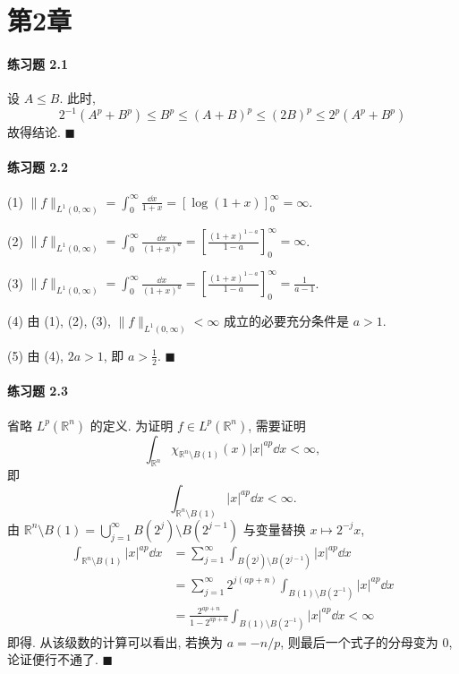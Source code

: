 \section*{第2章}

\paragraph*{练习题 2.1}
设 $A \leq B$. 此时,
\[
2^{-1}(A^{p}+B^{p}) \leq B^{p} \leq (A+B)^{p} \leq (2B)^{p} \leq 2^{p}(A^{p}+B^{p})
\]
故得结论. $\blacksquare$

\paragraph*{练习题 2.2}
(1) $\|f\|_{L^{1}(0,\infty)} = \int_{0}^{\infty}\frac{\dd x}{1+x} = [\log(1+x)]_{0}^{\infty} = \infty$.

(2) $\|f\|_{L^{1}(0,\infty)} = \int_{0}^{\infty}\frac{\dd x}{(1+x)^{a}} = \left[\frac{(1+x)^{1-a}}{1-a}\right]_{0}^{\infty} = \infty$.

(3) $\|f\|_{L^{1}(0,\infty)} = \int_{0}^{\infty}\frac{\dd x}{(1+x)^{a}} = \left[\frac{(1+x)^{1-a}}{1-a}\right]_{0}^{\infty} = \frac{1}{a-1}$.

(4) 由 (1), (2), (3), $\|f\|_{L^{1}(0,\infty)} < \infty$ 成立的必要充分条件是 $a > 1$.

(5) 由 (4), $2a > 1$, 即 $a > \frac{1}{2}$. $\blacksquare$

\paragraph*{练习题 2.3}
省略 $L^{p}(\mathbb{R}^{n})$ 的定义. 为证明 $f \in L^{p}(\mathbb{R}^{n})$, 需要证明
\[
\int_{\mathbb{R}^{n}}\chi_{\mathbb{R}^{n}\setminus B(1)}(x)|x|^{ap}\dd x < \infty,
\]
即
\[
\int_{\mathbb{R}^{n}\setminus B(1)}|x|^{ap}\dd x < \infty.
\]
由 $\mathbb{R}^{n}\setminus B(1) = \bigcup_{j=1}^{\infty}B(2^{j})\setminus B(2^{j-1})$ 与变量替换 $x \mapsto 2^{-j}x$,
\begin{align*}
\int_{\mathbb{R}^{n}\setminus B(1)}|x|^{ap}\dd x &= \sum_{j=1}^{\infty}\int_{B(2^{j})\setminus B(2^{j-1})}|x|^{ap}\dd x \\
&= \sum_{j=1}^{\infty}2^{j(ap+n)}\int_{B(1)\setminus B(2^{-1})}|x|^{ap}\dd x \\
&= \frac{2^{ap+n}}{1-2^{ap+n}}\int_{B(1)\setminus B(2^{-1})}|x|^{ap}\dd x < \infty
\end{align*}
即得. 从该级数的计算可以看出, 若换为 $a = -n/p$, 则最后一个式子的分母变为 $0$, 论证便行不通了. $\blacksquare$

